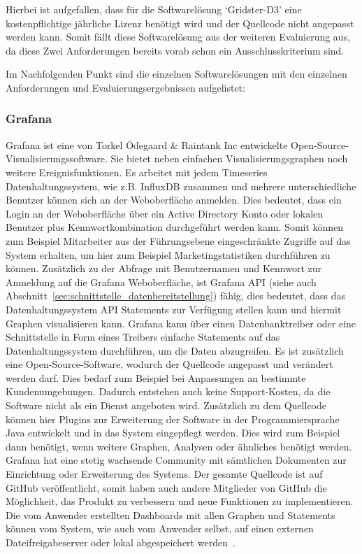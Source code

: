 Hierbei ist aufgefallen, dass für die Softwarelösung `Gridster-D3' eine
kostenpflichtige jährliche Lizenz benötigt wird und der Quellcode nicht
angepasst werden kann. Somit fällt diese Softwarelösung aus der weiteren
Evaluierung aus, da diese Zwei Anforderungen bereits vorab schon ein
Ausschlusskriterium sind.

Im Nachfolgenden Punkt sind die einzelnen Softwarelösungen mit den einzelnen
Anforderungen und Evaluierungsergebnissen aufgelistet:
\mr%

\subsubsection{Grafana}
\label{subsubsec:grafana}
Grafana ist eine von Torkel Ödegaard \& Raintank Inc entwickelte
Open-Source-Visualisierungssoftware. Sie bietet neben einfachen
Visualisierungsgraphen noch weitere Ereignisfunktionen. Es arbeitet mit jedem
Timeseries Datenhaltungssystem, wie z.B. InfluxDB zusammen und mehrere
unterschiedliche Benutzer können sich an der Weboberfläche anmelden. Dies
bedeutet, dass ein Login an der Weboberfläche über ein \gls{Active Directory}
Konto oder lokalen Benutzer plus Kennwortkombination durchgeführt werden kann.
Somit können zum Beispiel Mitarbeiter aus der Führungsebene eingeschränkte
Zugriffe auf das System erhalten, um hier zum Beispiel Marketingstatistiken
durchführen zu können. Zusätzlich zu der Abfrage mit Benutzernamen und Kennwort
zur Anmeldung auf die Grafana Weboberfläche, ist Grafana API (siehe auch
Abschnitt~\ref{sec:schnittstelle_datenbereitstellung}) fähig, dies bedeutet,
dass das Datenhaltungssystem API Statements zur Verfügung stellen kann und
hiermit Graphen visualisieren kann. Grafana kann über einen
\gls{Datenbanktreiber} oder eine Schnittstelle in Form eines Treibers einfache
Statements auf das Datenhaltungssystem durchführen, um die Daten abzugreifen.
Es ist zusätzlich eine Open-Source-Software, wodurch der Quellcode angepasst
und verändert werden darf. Dies bedarf zum Beispiel bei Anpassungen an
bestimmte Kundenumgebungen. Dadurch entstehen auch keine Support-Kosten, da die
Software nicht als ein Dienst angeboten wird. Zusätzlich zu dem Quellcode
können hier Plugins zur Erweiterung der Software in der Programmiersprache Java
entwickelt und in das System eingepflegt werden. Dies wird zum Beispiel dann
benötigt, wenn weitere Graphen, Analysen oder ähnliches benötigt werden.
Grafana hat eine stetig wachsende Community mit sämtlichen Dokumenten zur
Einrichtung oder Erweiterung des Systems. Der gesamte Quellcode ist auf GitHub
veröffentlicht, somit haben auch andere Mitglieder von GitHub die Möglichkeit,
das Produkt zu verbessern und neue Funktionen zu implementieren. Die vom
Anwender erstellten Dashboards mit allen Graphen und Statements können vom
System, wie auch vom Anwender selbst, auf einen externen Dateifreigabeserver
oder lokal abgespeichert werden~\cite{grafana}.


